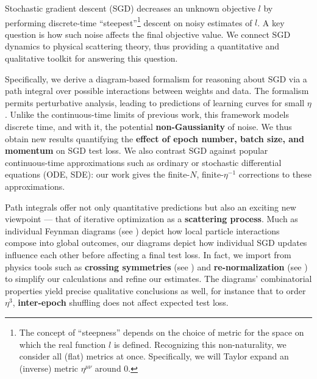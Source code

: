 \documentclass{article}
\begin{document}

    Stochastic gradient descent (SGD) decreases an unknown objective $l$ by
    performing discrete-time ``steepest''\footnote{
        The concept of ``steepness'' depends on the choice of metric for the
        space on which the real function $l$ is defined.  Recognizing this
        non-naturality, we consider all (flat) metrics at once.  Specifically,
        we will Taylor expand an (inverse) metric $\eta^{\mu\nu}$ around $0$.
    } descent on noisy estimates of $l$.  A key question is how such noise
    affects the final objective value.  We connect SGD dynamics to physical
    scattering theory, thus providing a quantitative and qualitative toolkit
    for answering this question.


    Specifically, we derive a diagram-based formalism for reasoning about SGD
    via a path integral over possible interactions between weights and data.
    The formalism permits perturbative analysis, leading to predictions of
    learning curves for small $\eta$.  Unlike the continuous-time limits of
    previous work, this framework models discrete time, and with it, the
    potential {\bf non-Gaussianity} of noise.  We thus obtain new results
    quantifying the {\bf effect of epoch number, batch size, and momentum} on
    SGD test loss.  We also contrast SGD against popular continuous-time
    approximations such as ordinary or stochastic differential equations (ODE,
    SDE): our work gives the finite-$N$, finite-$\eta^{-1}$ corrections to 
    these approximations.
    

    Path integrals offer not only quantitative predictions but also an exciting
    new viewpoint --- that of iterative optimization as a {\bf scattering
    process}.  Much as individual Feynman diagrams (see \citet{dy49a}) depict
    how local particle interactions compose into global outcomes, our diagrams
    depict how individual SGD updates influence each other before affecting a
    final test loss.  In fact, we import from physics tools such as {\bf
    crossing symmetries} (see \citet{dy49b}) and {\bf re-normalization} (see
    \citet{ge54}) to simplify our calculations and refine our estimates.  The
    diagrams' combinatorial properties yield precise qualitative conclusions as
    well, for instance that to order $\eta^3$, {\bf inter-epoch} shuffling does
    not affect expected test loss.
\end{document}
